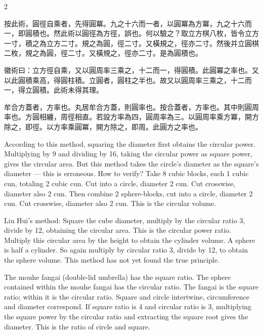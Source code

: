 \documentclass[10pt,a4paper]{article}
\begin{document}
\begin{paracol}{2}

\begin{leftcolumn*}
\begin{commentarybi}
按此術，圓徑自乘者，先得圓冪。九之十六而一者，以圓冪為方冪，九之十六而一，即圓積也。然此術以圓徑為方徑，誤也。何以驗之？取立方棋八枚，皆令立方一寸，積之為立方二寸。規之為圓，徑二寸。又橫規之，徑亦二寸。然後并立圓棋二枚，規之為圓，徑二寸。又橫規之，徑亦二寸。是為圓積也。

徽術曰：立方徑自乘，又以圓周率三乘之，十二而一，得圓積。此圓冪之率也。又以此圓積乘高，得圓柱積。立圓者，圓柱之半也。故又以圓周率三乘之，十二而一，得立圓積。此術未得其理。

牟合方蓋者，方率也。丸居牟合方蓋，則圓率也。按合蓋者，方率也。其中則圓周率也。方圓相纏，周徑相直。若設方率為四，圓周率為三。以圓周率乘方冪，開方除之，即徑。以方率乘圓冪，開方除之，即周。此圓方之率也。
\end{commentarybi}
\end{leftcolumn*}

\begin{rightcolumn*}
\begin{commentarybi}
According to this method, squaring the diameter first obtains the circular power. Multiplying by 9 and dividing by 16, taking the circular power as square power, gives the circular area. But this method takes the circle's diameter as the square's diameter --- this is erroneous. How to verify? Take 8 cubic blocks, each 1 cubic cun, totaling 2 cubic cun. Cut into a circle, diameter 2 cun. Cut crosswise, diameter also 2 cun. Then combine 2 sphere-blocks, cut into a circle, diameter 2 cun. Cut crosswise, diameter also 2 cun. This is the circular volume.

Liu Hui's method: Square the cube diameter, multiply by the circular ratio 3, divide by 12, obtaining the circular area. This is the circular power ratio. Multiply this circular area by the height to obtain the cylinder volume. A sphere is half a cylinder. So again multiply by circular ratio 3, divide by 12, to obtain the sphere volume. This method has not yet found the true principle.

The mouhe fangai (double-lid umbrella) has the square ratio. The sphere contained within the mouhe fangai has the circular ratio. The fangai is the square ratio; within it is the circular ratio. Square and circle intertwine, circumference and diameter correspond. If square ratio is 4 and circular ratio is 3, multiplying the square power by the circular ratio and extracting the square root gives the diameter. This is the ratio of circle and square.
\end{commentarybi}
\end{rightcolumn*}

\end{paracol}
\end{document}
